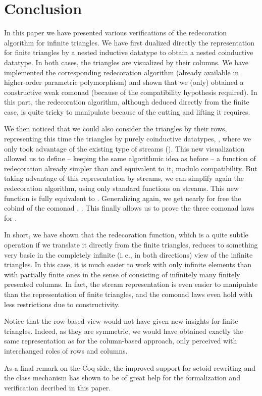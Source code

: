 \section{Conclusion}

In this paper we have presented various verifications of the
redecoration algorithm for infinite triangles. We have first dualized
directly the representation for finite triangles by a nested inductive
datatype to obtain a nested coinductive datatype. In both cases, the
triangles are visualized by their columns. We have implemented the
corresponding redecoration algorithm \redec{} (already available \cite{grossestcspaper} in
higher-order parametric polymorphism) and
shown that we (only) obtained a constructive weak comonad (because of
the compatibility hypothesis required). In this part, the redecoration
algorithm, although deduced directly from the finite case, is quite
tricky to manipulate because of the cutting and lifting it requires.

We then noticed that we could also consider
the triangles by their rows, representing this time the triangles by
purely coinductive datatypes, \TriS{}, where we only took advantage of the
existing type of streams (\Str). This new visualization allowed us to
define -- keeping the same algorithmic idea as before -- a function of
redecoration \redecS{} already simpler than \redec{} and equivalent to
it, modulo compatibility. But taking advantage of this
representation by streams, we can simplify again the redecoration algorithm,
using only standard functions on streams. This new function
\redecSS{} is fully equivalent to \redecS{}. Generalizing again, we
get nearly for free the cobind of the comonad \Str{}, \redecSG{}. This
finally allows us to prove the three comonad laws for \redecSS{}. 

In short, we have shown that the redecoration function, which is a
quite subtle operation if we translate it directly from the finite
triangles, reduces to something very basic in the completely infinite
(i.\,e., in both directions) view of the infinite
triangles. 
In this case, it is much easier to work with only infinite elements
than with partially finite ones in the sense of consisting of
infinitely many finitely presented columns. In fact, the stream
representation is even easier to manipulate than the representation of
finite triangles, and the comonad laws even hold with less
restrictions due to constructivity. 

Notice that the row-based view would 
not have given new insights for finite triangles. Indeed, as they are
symmetric, we would have obtained exactly the same representation as
for the column-based approach, only perceived with interchanged roles
of rows and columns.

As a final remark on the Coq side, the improved support for setoid
rewriting and the class mechanism \cite{DBLP:conf/tphol/SozeauO08} has
shown to be of great help for the formalization and verification
decribed in this paper.



